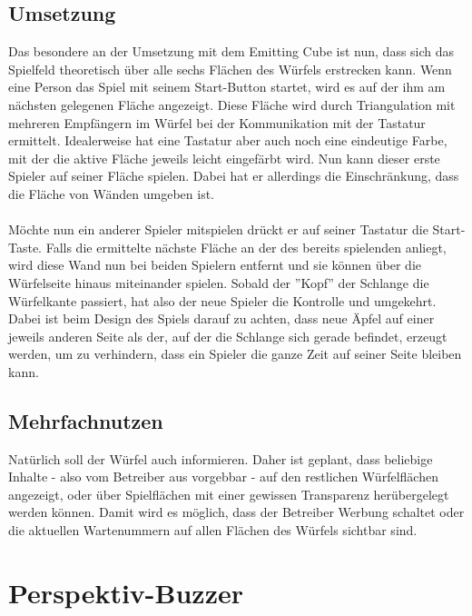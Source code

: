 \documentclass[pdftex,12pt,a4paper]{report}
\begin{document}
\subsection{Umsetzung}
Das besondere an der Umsetzung mit dem Emitting Cube ist nun, dass sich das Spielfeld theoretisch über alle sechs Flächen des Würfels erstrecken kann.
Wenn eine Person das Spiel mit seinem Start-Button startet, wird es auf der ihm am nächsten gelegenen Fläche angezeigt.
Diese Fläche wird durch Triangulation mit mehreren Empfängern im Würfel bei der Kommunikation mit der Tastatur ermittelt.
Idealerweise hat eine Tastatur aber auch noch eine eindeutige Farbe, mit der die aktive Fläche jeweils leicht eingefärbt wird.
Nun kann dieser erste Spieler auf seiner Fläche spielen.
Dabei hat er allerdings die Einschränkung, dass die Fläche von Wänden umgeben ist.\\
\\
Möchte nun ein anderer Spieler mitspielen drückt er auf seiner Tastatur die Start-Taste.
Falls die ermittelte nächste Fläche an der des bereits spielenden anliegt, wird diese Wand nun bei beiden Spielern entfernt und sie können über die Würfelseite hinaus miteinander spielen.
Sobald der ''Kopf'' der Schlange die Würfelkante passiert, hat also der neue Spieler die Kontrolle und umgekehrt.
Dabei ist beim Design des Spiels darauf zu achten, dass neue Äpfel auf einer jeweils anderen Seite als der, 
auf der die Schlange sich gerade befindet, erzeugt werden, um zu verhindern, dass ein Spieler die ganze Zeit auf seiner Seite bleiben kann.

\subsection{Mehrfachnutzen}
Natürlich soll der Würfel auch informieren.
Daher ist geplant, dass beliebige Inhalte - also vom Betreiber aus vorgebbar - 
auf den restlichen Würfelflächen angezeigt, oder über Spielflächen mit einer gewissen Transparenz herübergelegt werden können.
Damit wird es möglich, dass der Betreiber Werbung schaltet oder die aktuellen Wartenummern auf allen Flächen des Würfels sichtbar sind.

\section{Perspektiv-Buzzer}
\end{document}
